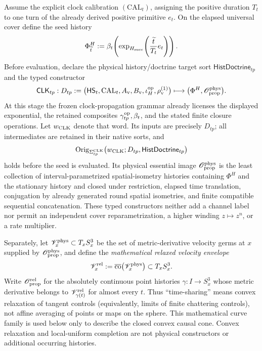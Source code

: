 \documentclass[12pt,a4paper]{article}
\begin{document}
\begin{definition}
Assume the explicit clock calibration \((\mathrm{CAL}_{t})\), assigning the
positive duration \(T_t\) to one turn of the already derived positive
primitive \(e_t\).  On the elapsed universal cover define the seed history
\begin{equation}
\label{p3a:eq:clocked-hopf-seed}
 \Phi^H_{\widetilde t}
 :=\beta_t\!\left(
 \exp_{H_{\rm succ}}\!\left(\frac{\widetilde t}{T_t}e_t\right)
 \right).
\end{equation}
Before evaluation, declare the physical history/doctrine target sort
\(\mathsf{HistDoctrine}_{tp}\) and the typed constructor
\[
 \mathsf{CLK}_{tp}:
 D_{tp}:=\bigl(\mathsf{HS}_t,\mathrm{CAL}_t,
 A_{\rm v},B_{\rm v},\iota_H^{\rm op},\rho_{\rm v}^{(1)}\bigr)
 \longmapsto
 \bigl(\Phi^H,\mathscr O_{\rm prop}^{\rm phys}\bigr).
\]
At this stage the frozen clock-propagation grammar already licenses the
displayed exponential, the retained composites
\(\gamma_{tp}^{\rm op},\beta_t\), and the stated finite closure operations.
Let \(w_{\rm CLK}\) denote that word.  Its inputs are precisely \(D_{tp}\);
all intermediates are retained in their native sorts, and
\[
 \operatorname{Orig}_{\Sigma_{tp}^{\rm CLK}}
 \bigl(w_{\rm CLK};D_{tp},\mathsf{HistDoctrine}_{tp}\bigr)
\]
holds before the seed is evaluated.
Its physical essential image
\(\mathscr O_{\rm prop}^{\rm phys}\) is the least collection of
interval-parametrized spatial-isometry histories containing
\(\Phi^H\) and the stationary history and closed under restriction, elapsed
time translation, conjugation by already generated round spatial isometries,
and finite compatible sequential concatenation.  These typed constructors
neither add a channel label nor permit an independent cover reparametrization,
a higher winding \(z\mapsto z^n\), or a rate multiplier.

Separately, let \(\mathscr V_x^{\rm phys}\subset T_xS_x^3\) be the set of
metric-derivative velocity germs at \(x\) supplied by
\(\mathscr O_{\rm prop}^{\rm phys}\), and define the \emph{mathematical
relaxed velocity envelope}
\[
 \mathscr V_x^{\rm rel}
 :=\overline{\operatorname{co}}\bigl(\mathscr V_x^{\rm phys}\bigr)
 \subset T_xS_x^3.
\]
Write \(\mathscr O_{\rm prop}^{\rm rel}\) for the absolutely continuous
point histories \(\gamma:I\to S_x^3\) whose metric derivative belongs to
\(\mathscr V_{\gamma(t)}^{\rm rel}\) for almost every \(t\).  Thus
``time-sharing'' means convex relaxation of tangent controls (equivalently,
limits of finite chattering controls), not affine averaging of points or maps
on the sphere.  This mathematical curve family is used below only to describe
the closed convex causal cone.  Convex relaxation and local-uniform completion
are not physical constructors or additional occurring histories.


\end{definition}
\end{document}
